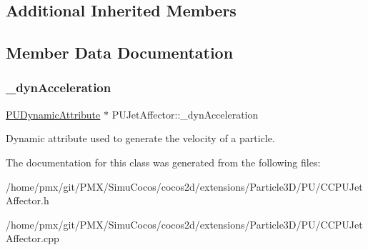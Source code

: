 \subsection*{Additional Inherited Members}


\subsection{Member Data Documentation}
\mbox{\label{classPUJetAffector_aeaa71f70b8a36196aadb301eae0f4a05}} 
\subsubsection{\texorpdfstring{\+\_\+dyn\+Acceleration}{\_dynAcceleration}}
{\footnotesize\ttfamily \hyperlink{classPUDynamicAttribute}{P\+U\+Dynamic\+Attribute} $\ast$ P\+U\+Jet\+Affector\+::\+\_\+dyn\+Acceleration\hspace{0.3cm}{\ttfamily [protected]}}

Dynamic attribute used to generate the velocity of a particle. 

The documentation for this class was generated from the following files\+:\begin{DoxyCompactItemize}
\item 
/home/pmx/git/\+P\+M\+X/\+Simu\+Cocos/cocos2d/extensions/\+Particle3\+D/\+P\+U/C\+C\+P\+U\+Jet\+Affector.\+h\item 
/home/pmx/git/\+P\+M\+X/\+Simu\+Cocos/cocos2d/extensions/\+Particle3\+D/\+P\+U/C\+C\+P\+U\+Jet\+Affector.\+cpp\end{DoxyCompactItemize}

